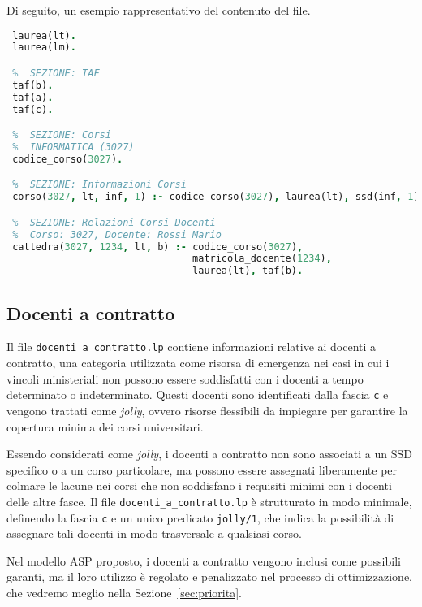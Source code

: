 Di seguito, un esempio rappresentativo del contenuto del file.

\begin{lstlisting}[language=prolog, caption={Esempio struttura dati di \texttt{coperture.lp}.}]    
 %  SEZIONE: Tipi di Corso
 laurea(lt).
 laurea(lm).

 %  SEZIONE: TAF
 taf(b).
 taf(a).
 taf(c).

 %  SEZIONE: Corsi
 %  INFORMATICA (3027)
 codice_corso(3027).

 %  SEZIONE: Informazioni Corsi
 corso(3027, lt, inf, 1) :- codice_corso(3027), laurea(lt), ssd(inf, 1).

 %  SEZIONE: Relazioni Corsi-Docenti
 %  Corso: 3027, Docente: Rossi Mario
 cattedra(3027, 1234, lt, b) :- codice_corso(3027), 
                                matricola_docente(1234), 
                                laurea(lt), taf(b).

\end{lstlisting}


\subsection{Docenti a contratto}\label{sec:rules-docenti-contratto}

Il file \texttt{docenti\_a\_contratto.lp} contiene informazioni relative ai docenti a 
contratto, una categoria utilizzata come risorsa di emergenza nei casi in cui i vincoli 
ministeriali non possono essere soddisfatti con i docenti a tempo determinato o 
indeterminato. Questi docenti sono identificati dalla fascia \texttt{c} e vengono 
trattati come \textit{jolly}, ovvero risorse flessibili da impiegare per garantire la 
copertura minima dei corsi universitari.

Essendo considerati come \textit{jolly}, i docenti a contratto non sono associati a 
un SSD specifico o a un corso particolare, ma possono essere assegnati liberamente per 
colmare le lacune nei corsi che non soddisfano i requisiti minimi con i docenti delle 
altre fasce. Il file \texttt{docenti\_a\_contratto.lp} è strutturato in modo minimale, 
definendo la fascia \texttt{c} e un unico predicato \texttt{jolly/1}, che indica la 
possibilità di assegnare tali docenti in modo trasversale a qualsiasi corso.

Nel modello ASP proposto, i docenti a contratto vengono inclusi come possibili garanti, 
ma il loro utilizzo è regolato e penalizzato nel processo di ottimizzazione, che vedremo
meglio nella Sezione~\ref{sec:priorita}. 

